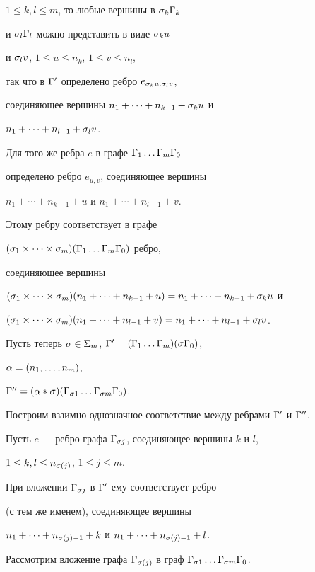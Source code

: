 \begin{pf}
$1\leq k, l\leq m$, то любые вершины в $\sigma_k{\Gamma}_k$ 


и $\sigma_l{\Gamma}_l$ можно представить в виде $\sigma_ku$ 


и $\sigma_lv$, $1\leq u\leq n_k$, $1\leq v\leq n_l$, 


так что в ${\Gamma}'$ определено ребро $e_{\sigma_ku, \sigma_lv}$, 


соединяющее вершины $n_1+\dotsb +n_{k-1}+\sigma_ku$ и


$n_1+\dotsb +n_{l-1}+\sigma_lv$. 


Для того же ребра $e$ в графе ${\Gamma}_1\dotsc {\Gamma}_m{\Gamma}_0$ 


определено ребро $e_{u,v}$, соединяющее вершины 


$n_1+\dotsb +n_{k-1}+u$ и $n_1+\dotsb +n_{l-1}+v$.


Этому ребру соответствует в графе 


$(\sigma_1\times \dotsb \times \sigma_m)({\Gamma}_1\dotsc {\Gamma}_m{\Gamma}_0)$ ребро, 


соединяющее вершины 


$(\s_1\times \dotsb \times \s_m)(n_1+\dotsb +n_{k-1}+u)=


n_1+\dotsb +n_{k-1}+\s_ku$ и


$(\s_1\times \dotsb \times \s_m)(n_1+\dotsb +n_{l-1}+v)=


n_1+\dotsb +n_{l-1}+\s_lv$.





Пусть теперь $\sigma\in\Sigma_m$, ${\Gamma}'=({\Gamma}_1\dotsc {\Gamma}_m)(\sigma{\Gamma}_0)$,


$\alpha=(n_1,\dotsc ,n_m)$, 


${\Gamma}''=(\alpha * \sigma)({\Gamma}_{\sigma 1}\dotsc {\Gamma}_{\sigma m}{\Gamma}_0)$.


Построим взаимно однозначное соответствие между ребрами ${\Gamma}'$ и ${\Gamma}''$. 





Пусть $e$ --- ребро графа ${\Gamma}_{\sigma j}$, соединяющее вершины $k$ и $l$,


$1\leq k,l\leq n_{\sigma (j)}$, $1\leq j\leq m$. 


При вложении ${\Gamma}_{\sigma j}$ в ${\Gamma}'$ ему соответствует ребро 


(с тем же именем), соединяющее вершины 


$n_1+\dotsb +n_{\sigma (j)-1}+k$ и $n_1+\dotsb +n_{\sigma (j)-1}+l$. 





Рассмотрим вложение графа ${\Gamma}_{\sigma (j)}$ в граф ${\Gamma}_{\sigma 1}\dotsc {\Gamma}_{\sigma m}{\Gamma}_0$. 



\end{pf}
